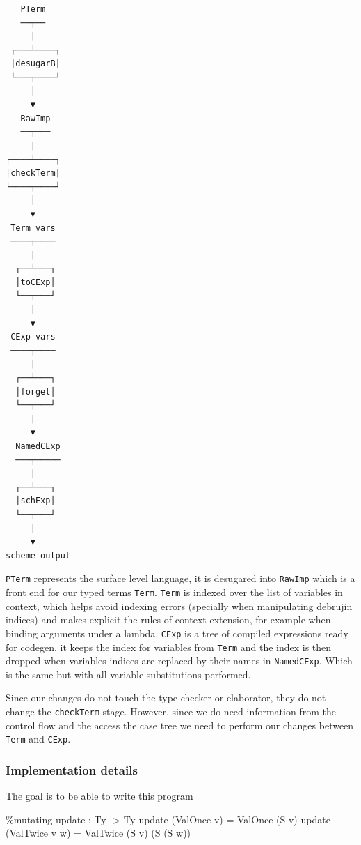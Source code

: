 \documentclass[
]{article}
\newenvironment{Shaded}{}{}
\newcommand{\DataTypeTok}[1]{\textcolor[rgb]{0.56,0.13,0.00}{#1}}
\newcommand{\NormalTok}[1]{#1}
\newcommand{\OperatorTok}[1]{\textcolor[rgb]{0.40,0.40,0.40}{#1}}
\newcommand{\OtherTok}[1]{\textcolor[rgb]{0.00,0.44,0.13}{#1}}
\begin{document}
\begin{verbatim}
   PTerm
   ──┬──
     |
 ┌───┴────┐
 |desugarB|
 └───┬────┘
     │
     ▼
   RawImp
   ──┬───
     |
┌────┴────┐
|checkTerm|
└────┬────┘
     │
     ▼
 Term vars
 ────┬────
     |
  ┌──┴───┐
  │toCExp│
  └──┬───┘
     |
     ▼
 CExp vars
 ────┬────
     |
  ┌──┴───┐
  │forget│
  └──┬───┘
     |
     ▼
  NamedCExp
  ───┬─────
     |
  ┌──┴───┐
  │schExp│
  └──┬───┘
     |
     ▼
scheme output
\end{verbatim}

\texttt{PTerm} represents the surface level language, it is desugared
into \texttt{RawImp} which is a front end for our typed terms
\texttt{Term}. \texttt{Term} is indexed over the list of variables in
context, which helps avoid indexing errors (specially when manipulating
debrujin indices) and makes explicit the rules of context extension, for
example when binding arguments under a lambda. \texttt{CExp} is a tree
of compiled expressions ready for codegen, it keeps the index for
variables from \texttt{Term} and the index is then dropped when
variables indices are replaced by their names in \texttt{NamedCExp}.
Which is the same but with all variable substitutions performed.

Since our changes do not touch the type checker or elaborator, they do
not change the \texttt{checkTerm} stage. However, since we do need
information from the control flow and the access the case tree we need
to perform our changes between \texttt{Term} and \texttt{CExp}.

\hypertarget{implementation-details}{%
\subsubsection{Implementation details}\label{implementation-details}}

The goal is to be able to write this program

\begin{Shaded}
\begin{Highlighting}[]
\OperatorTok{\%}\NormalTok{mutating}
\NormalTok{update }\OperatorTok{:} \DataTypeTok{Ty} \OtherTok{{-}\textgreater{}} \DataTypeTok{Ty}
\NormalTok{update (}\DataTypeTok{ValOnce}\NormalTok{ v) }\OtherTok{=} \DataTypeTok{ValOnce}\NormalTok{ (}\DataTypeTok{S}\NormalTok{ v)}
\NormalTok{update (}\DataTypeTok{ValTwice}\NormalTok{ v w) }\OtherTok{=} \DataTypeTok{ValTwice}\NormalTok{ (}\DataTypeTok{S}\NormalTok{ v) (}\DataTypeTok{S}\NormalTok{ (}\DataTypeTok{S}\NormalTok{ w))}
\end{Highlighting}
\end{Shaded}
\end{document}
